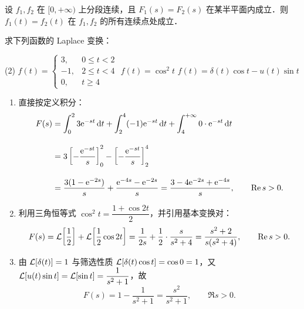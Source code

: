 \documentclass[12pt, a4paper, oneside, UTF8]{ctexbook}
\begin{document}
\begin{theorem}[唯一性定理]
设 $f_1,f_2$ 在 $[0,+\infty)$ 上分段连续，且 $F_1(s)=F_2(s)$ 在某半平面内成立．则 $f_1(t) = f_2(t)$ 在 $f_1,f_2$ 的所有连续点处成立．
\end{theorem}

\begin{example}
    求下列函数的 Laplace 变换：
    \begin{tasks}[label=(\arabic*)](2)
        \task $\displaystyle f(t) = \begin{cases}
            3, & 0\le t<2\\
            -1, & 2\le t<4\\
            0, & t\ge 4
            \end{cases}$
        \task $\displaystyle f(t) = \cos^2 t$
        \task $\displaystyle f(t) = \delta(t)\cos t - u(t)\sin t$
    \end{tasks} 
\end{example}
\begin{solution}
    \begin{enumerate}[label=(\arabic*)]
        \item 直接按定义积分：
        \[
        \begin{aligned}
        F(s) &= \int_0^{2} 3\mathrm{e}^{-st}\,\mathrm{d} t + \int_2^{4} (-1)\mathrm{e}^{-st}\,\mathrm{d} t + \int_4^{+\infty} 0\cdot\mathrm{e}^{-st}\,\mathrm{d} t \\[1em]
        &= 3\left[-\frac{\mathrm{e}^{-st}}{s}\right]_0^2 - \left[-\frac{\mathrm{e}^{-st}}{s}\right]_2^4 \\[1em]
        &= \frac{3(1-\mathrm{e}^{-2s})}{s} + \frac{\mathrm{e}^{-4s}-\mathrm{e}^{-2s}}{s}
        = \frac{3 - 4\mathrm{e}^{-2s} + \mathrm{e}^{-4s}}{s},\qquad \Re s>0.
        \end{aligned}
        \]

        \item 利用三角恒等式 $\cos^2 t=\dfrac{1+\cos 2t}{2}$，并引用基本变换对：
        \[
        F(s) = \mathcal{L}\!\left[\frac{1}{2}\right] + \mathcal{L}\!\left[\frac{1}{2}\cos 2t\right]
        = \frac{1}{2s} + \frac{1}{2}\cdot\frac{s}{s^2+4}
        = \frac{s^2+2}{s(s^2+4)},\qquad \Re s>0.
        \]

        \item 由 $\mathcal{L}[\delta(t)]=1$ 与筛选性质 $\mathcal{L}[\delta(t)\cos t]=\cos 0=1$，又 $\mathcal{L}[u(t)\sin t]=\mathcal{L}[\sin t]=\dfrac{1}{s^2+1}$，故
        \[
        F(s) = 1 - \frac{1}{s^2+1} = \frac{s^2}{s^2+1},\qquad \Re s>0.
        \]
    \end{enumerate}
\end{solution}
\end{document}

